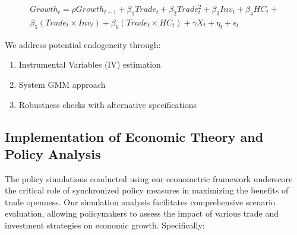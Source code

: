 \documentclass[12pt,a4paper]{article}
\theoremstyle{definition}
\begin{document}
\begin{equation}
\begin{split}
Growth_{t} = \rho Growth_{t-1} + \beta_1 Trade_t + \beta_2 Trade_t^2 + \beta_3 Inv_t + \beta_4 HC_t + \\
\beta_5 (Trade_t \times Inv_t) + \beta_6 (Trade_t \times HC_t) + \gamma X_t + \eta_t + \epsilon_t
\end{split}
\end{equation}

We address potential endogeneity through:
\begin{enumerate}
    \item Instrumental Variables (IV) estimation
    \item System GMM approach
    \item Robustness checks with alternative specifications
\end{enumerate}

\subsection{Implementation of Economic Theory and Policy Analysis}
The policy simulations conducted using our econometric framework underscore the critical role of synchronized policy measures in maximizing the benefits of trade openness. Our simulation analysis facilitates comprehensive scenario evaluation, allowing policymakers to assess the impact of various trade and investment strategies on economic growth. Specifically:
\end{document}
